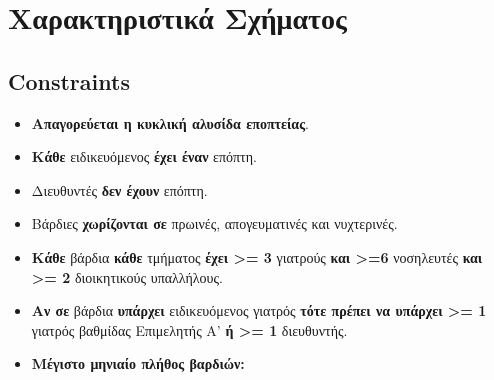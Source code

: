 \documentclass[13pt]{article}
\newcommand{\eng}[1]{\foreignlanguage{english}{#1}}
\begin{document}
\clearpage 

\section{Χαρακτηριστικά Σχήματος}
\subsection{\eng{Constraints}}

\begin{itemize}
\tightlist
\item
    \textbf{Απαγορεύεται η κυκλική αλυσίδα εποπτείας}.
\item
    \textbf{Κάθε} ειδικευόμενος \textbf{έχει έναν} επόπτη.
\item
    Διευθυντές \textbf{δεν έχουν} επόπτη.
\item
    Βάρδιες \textbf{χωρίζονται σε} πρωινές, απογευματινές και νυχτερινές.
\item
    \textbf{Κάθε} βάρδια \textbf{κάθε} τμήματος \textbf{έχει \textgreater= 3} γιατρούς \textbf{και \textgreater=6} νοσηλευτές \textbf{και \textgreater= 2} διοικητικούς υπαλλήλους.
\item
    \textbf{Αν σε} βάρδια \textbf{υπάρχει} ειδικευόμενος γιατρός \textbf{τότε πρέπει να υπάρχει \textgreater= 1} γιατρός βαθμίδας Επιμελητής Α' \textbf{ή \textgreater= 1} διευθυντής.
\item
    \textbf{Μέγιστο μηνιαίο πλήθος βαρδιών:} 


\end{itemize}
\end{document}
